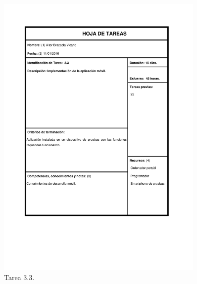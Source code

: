 \documentclass{DeustoFDP}
\begin{document}
\begin{figure}[H]
    \centering
    \includegraphics[width=0.9\textwidth]{fig/Tareas/33}
    \caption{Tarea 3.3.}
    \label{fig:t33}
\end{figure}
\end{document}
